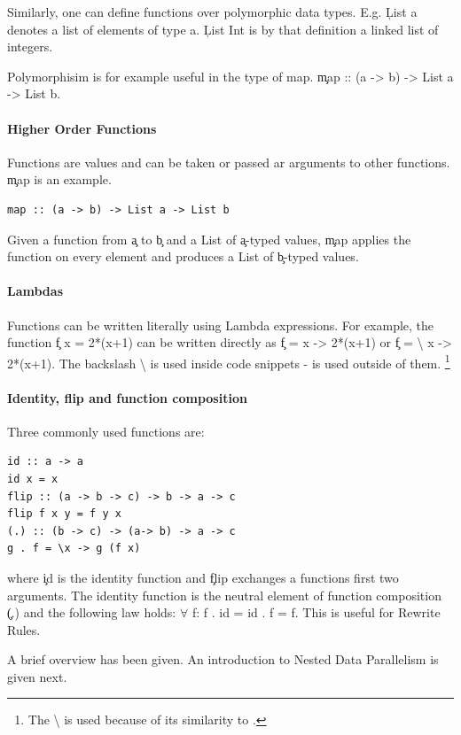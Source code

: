     Similarly, one can define functions over polymorphic data types.
    E.g. \c{List a} denotes a list of elements of type a. \c{List Int}
    is by that definition a linked list of integers.
    
    Polymorphisim is for example useful in the type of map.
    \c{map :: (a -> b) -> List a -> List b}.
  
  \paragraph{Higher Order Functions}
    Functions are values and can be taken or passed ar arguments to other functions.
    \c{map} is an example.
    \begin{lstlisting}
map :: (a -> b) -> List a -> List b
    \end{lstlisting}
    Given a function from \c{a} to \c{b} and a List of \c{a}-typed values,
    \c{map} applies the function on every element and produces a List
    of \c{b}-typed values.
    
  \paragraph{Lambdas}
    Functions can be written literally using Lambda expressions.
    For example, the function \c{f x = 2*(x+1)} can be written
    directly as \c{f = \lam x -> 2*(x+1)} or \c{f = \textbackslash{} x -> 2*(x+1)}.
    The backslash \textbackslash{} is used inside code snippets - \lam is used outside of them.
    \footnote{The \textbackslash{} is used because of its similarity to \lam.}
    
  \paragraph{Identity, flip and function composition}
    Three commonly used functions are:
    \begin{lstlisting}
id :: a -> a
id x = x
flip :: (a -> b -> c) -> b -> a -> c
flip f x y = f y x
(.) :: (b -> c) -> (a-> b) -> a -> c
g . f = \x -> g (f x)
    \end{lstlisting}
    where \c{id} is the identity function and \c{flip} exchanges a functions
    first two arguments.
    The identity function is the neutral element of function composition \c{(.)}
    and the following law holds:
     \c{\textrm{$\forall$} f: f . id = id . f = f}. This is useful for Rewrite Rules.

  A brief overview has been given. An introduction to Nested Data Parallelism is given next.

